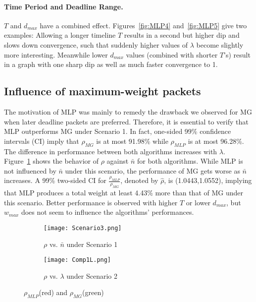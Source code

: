\documentclass[oribibl]{llncs}
\begin{document}
\paragraph{Time Period and Deadline Range.} $T$ and $d_{max}$ have a
combined effect. Figures~\ref{fig:MLP4} and~\ref{fig:MLP5} give two
examples: Allowing a longer timeline $T$ results in a second but
higher dip and slows down convergence, such that suddenly higher
values of $\lambda$ become slightly more interesting. Meanwhile lower
$d_{max}$ values (combined with shorter $T$'s) result in a graph with
one sharp dip as well as much faster convergence to 1.


\subsection{Influence of maximum-weight packets}
The motivation of MLP was mainly to remedy the drawback we observed
for MG when later deadline packets are preferred. Therefore, it is
essential to verify that MLP outperforms MG under Scenario 1. In fact,
one-sided 99\% confidence intervals (CI) imply that $\rho_{MG}$ is at
most 91.98\% while $\rho_{MLP}$ is at most 96.28\%. The difference in
performance between both algorithms increases with
$\lambda$. Figure~\ref{fig:Scenario3} shows the behavior of $\rho$
against $\bar{n}$ for both algorithms. While MLP is not influenced by
$\bar{n}$ under this scenario, the performance of MG gets worse as
$\bar{n}$ increases. A 99\% two-sided CI for
$\frac{\rho_{MLP}}{\rho_{MG}}$, denoted by $\hat{\rho}$, is
(1.0443,1.0552), implying that MLP produces a total weight at least
4.43\% more than that of MG under this scenario. Better performance is
observed with higher $T$ or lower $d_{max}$, but
$w_{max}$ does not seem to influence the algorithms' performances.
\vspace{-13pt}
\begin{figure}
\begin{subfigure}{.47\textwidth}
  \centering
\texttt{[image: Scenario3.png]}
\caption{$\rho$ vs. $\bar{n}$ under Scenario 1}
\label{fig:Scenario3}
\end{subfigure}
\hfill
\begin{subfigure}{.47\textwidth}
  \centering 
\texttt{[image: Comp1L.png]}
\caption{$\rho$ vs. $\lambda$ under Scenario 2}
\label{fig:CompL}
\end{subfigure}
\caption{$\rho_{MLP}$(red) and $\rho_{MG}$(green)} 
\end{figure}
\end{document}
